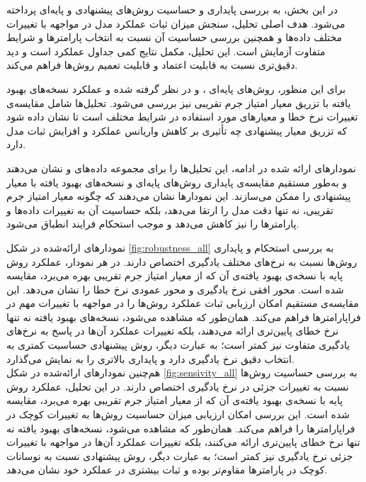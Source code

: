 


در این بخش، به بررسی پایداری و حساسیت روش‌های پیشنهادی و پایه‌ای پرداخته می‌شود. هدف اصلی تحلیل، سنجش میزان ثبات عملکرد مدل در مواجهه با تغییرات مختلف داده‌ها و همچنین بررسی حساسیت آن نسبت به انتخاب پارامترها و شرایط متفاوت آزمایش است. این تحلیل، مکمل نتایج کمی جداول عملکرد است و دید دقیق‌تری نسبت به قابلیت اعتماد و قابلیت تعمیم روش‌ها فراهم می‌کند.

برای این منظور، روش‌های پایه‌ای ،  و  در نظر گرفته شده و عملکرد نسخه‌های بهبود یافته با تزریق معیار امتیاز جرم تقریبی نیز بررسی می‌شود. تحلیل‌ها شامل مقایسه‌ی تغییرات نرخ خطا و معیارهای مورد استفاده در شرایط مختلف است تا نشان داده شود که تزریق معیار پیشنهادی چه تأثیری بر کاهش واریانس عملکرد و افزایش ثبات مدل دارد.

نمودارهای ارائه شده در ادامه، این تحلیل‌ها را برای مجموعه داده‌های  و  نشان می‌دهند و به‌طور مستقیم مقایسه‌ی پایداری روش‌های پایه‌ای و نسخه‌های بهبود یافته با معیار پیشنهادی را ممکن می‌سازند. این نمودارها نشان می‌دهند که چگونه معیار امتیاز جرم تقریبی، نه تنها دقت مدل را ارتقا می‌دهد، بلکه حساسیت آن به تغییرات داده‌ها و پارامترها را نیز کاهش می‌دهد و موجب استحکام فرایند انطباق می‌شود.

نمودارهای ارائه‌شده در شکل  \ref{fig:robustness_all} به بررسی استحکام و پایداری روش‌ها نسبت به نرخ‌های مختلف یادگیری اختصاص دارند. در هر نمودار، عملکرد روش پایه با نسخه‌ی بهبود یافته‌ی آن که از معیار امتیاز جرم تقریبی بهره می‌برد، مقایسه شده است. محور افقی نرخ یادگیری و محور عمودی نرخ خطا را نشان می‌دهد.
این مقایسه‌ی مستقیم امکان ارزیابی ثبات عملکرد روش‌ها را در مواجهه با تغییرات مهم در فراپارامترها فراهم می‌کند. همان‌طور که مشاهده می‌شود، نسخه‌های بهبود یافته نه تنها نرخ خطای پایین‌تری ارائه می‌دهند، بلکه تغییرات عملکرد آن‌ها در پاسخ به نرخ‌های یادگیری متفاوت نیز کمتر است؛ به عبارت دیگر، روش پیشنهادی حساسیت کمتری به انتخاب دقیق نرخ یادگیری دارد و پایداری بالاتری را به نمایش می‌گذارد.\\
هم‌چنین نمودار‌های ارائه‌شده در شکل \ref{fig:sensivity_all} به بررسی حساسیت روش‌ها نسبت به تغییرات جزئی در نرخ یادگیری اختصاص دارند. در این تحلیل، عملکرد روش پایه با نسخه‌ی بهبود یافته‌ی آن که از معیار امتیاز جرم تقریبی بهره می‌برد، مقایسه شده است. این بررسی امکان ارزیابی میزان حساسیت روش‌ها به تغییرات کوچک در فراپارامترها را فراهم می‌کند. همان‌طور که مشاهده می‌شود، نسخه‌های بهبود یافته نه تنها نرخ خطای پایین‌تری ارائه می‌کنند، بلکه تغییرات عملکرد آن‌ها در مواجهه با تغییرات جزئی نرخ یادگیری نیز کمتر است؛ به عبارت دیگر، روش پیشنهادی نسبت به نوسانات کوچک در پارامترها مقاوم‌تر بوده و ثبات بیشتری در عملکرد خود نشان می‌دهد.

